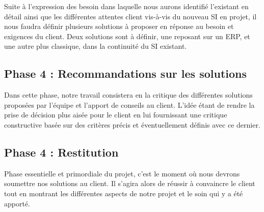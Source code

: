 Suite à l’expression des besoin dans laquelle nous aurons identifié l’existant en détail ainsi que les différentes attentes client vis-à-vis du nouveau SI en projet, il nous faudra définir plusieurs solutions à proposer en réponse au besoin et exigences du client. Deux solutions sont à définir, une reposant sur un ERP, et une autre plus classique, dans la continuité du SI existant.

\subsection{Phase 4 : Recommandations sur les solutions}
 
Dans cette phase, notre travail consistera en la critique des différentes solutions proposées par l’équipe et l’apport de conseils au client. L’idée étant de rendre la prise de décision plus aisée pour le client en lui fournissant une critique constructive basée sur des critères précis et éventuellement définis avec ce dernier.

\subsection{Phase 4 : Restitution}

Phase essentielle et primordiale du projet, c’est le moment où nous devrons soumettre nos solutions au client. Il s'agira alors de  réussir à convaincre le client tout en montrant les différentes aspects de notre projet et le soin qui y a été apporté.
